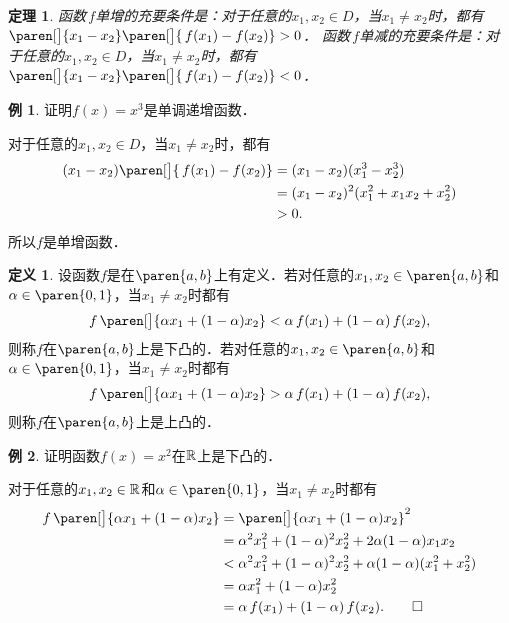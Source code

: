 \documentclass[a4paper,punct=CCT]{ctexbook}
\makeatletter
\newtheorem*{theorem*}{定理}
\theoremstyle{definition}
\newtheorem*{definition*}{定义}
\newtheorem*{example*}{例}
\theoremstyle{remark}
\renewenvironment{proof}[1][\proofname]{\par
  \pushQED{\qed}%
  \normalfont \topsep6\p@\@plus6\p@\relax
  \trivlist
  \item[]\ignorespaces
}{%
  \popQED\endtrivlist\@endpefalse
}
\makeatother
\begin{document}
\begin{theorem*}
  函数\(\,f\)单增的充要条件是：对于任意的\(x_1, x_2 \in D\)，当\(x_1 \ne x_2\)时，都有\(\paren[\big]{x_1 - x_2}\paren[\big]{\,f(x_1) - f(x_2)} > 0\)．
  函数\(\,f\)单减的充要条件是：对于任意的\(x_1, x_2 \in D\)，当\(x_1 \ne x_2\)时，都有\(\paren[\big]{x_1 - x_2}\paren[\big]{\,f(x_1) - f(x_2)} < 0\)．
\end{theorem*}

\begin{example*}
  证明\(f(x) = x^3\)是单调递增函数．

  \begin{proof}
    对于任意的\(x_1, x_2 \in D\)，当\(x_1 \ne x_2\)时，都有
    \[
      \begin{split}
        (x_1 - x_2) \paren[\big]{\,f(x_1) - f(x_2)}
        &= (x_1 - x_2) (x_1^3 - x_2^3) \\
        &= (x_1 - x_2)^2 (x_1^2 + x_1 x_2 + x_2^2) \\
        &> 0.
      \end{split}
    \]
    所以\(f\)是单增函数．
  \end{proof}
\end{example*}

\begin{definition*}
  设函数\(f\)是在\(\paren{a,b}\)上有定义．若对任意的\(x_1, x_2 \in \paren{a,b}\)和\(\alpha \in \paren{0,1}\)，当\(x_1 \ne x_2\)时都有
  \[
    f\,\paren[\big]{\alpha x_1 + (1-\alpha) x_2} < \alpha\,f(x_1) + (1-\alpha)\,f(x_2),
  \]
  则称\(f\)在\(\paren{a,b}\)上是下凸的．若对任意的\(x_1, x_2 \in \paren{a,b}\)和\(\alpha \in \paren{0,1}\)，当\(x_1 \ne x_2\)时都有
  \[
    f\,\paren[\big]{\alpha x_1 + (1-\alpha) x_2} > \alpha\,f(x_1) + (1-\alpha)\,f(x_2),
  \]
  则称\(f\)在\(\paren{a,b}\)上是上凸的．
\end{definition*}

\begin{example*}
  证明函数\(f(x) = x^2\)在\(\mathbb{R}\)上是下凸的．

  \begin{proof}
    对于任意的\(x_1, x_2 \in \mathbb{R}\)和\(\alpha \in \paren{0,1}\)，当\(x_1 \ne x_2\)时都有
    \[
      \begin{split}
        f\,\paren[\big]{\alpha x_1 + (1-\alpha) x_2}
        &= \paren[\big]{\alpha x_1 + (1-\alpha) x_2}^2 \\
        &= \alpha^2 x_1^2 + (1-\alpha)^2 x_2^2 + 2 \alpha (1-\alpha) x_1 x_2 \\
        &< \alpha^2 x_1^2 + (1-\alpha)^2 x_2^2 + \alpha (1-\alpha) (x_1^2 + x_2^2) \\
        &= \alpha x_1^2 + (1-\alpha) x_2^2 \\
        &= \alpha\,f(x_1) + (1-\alpha)\,f(x_2). \qedhere
      \end{split}
    \]
  \end{proof}
\end{example*}
\end{document}
